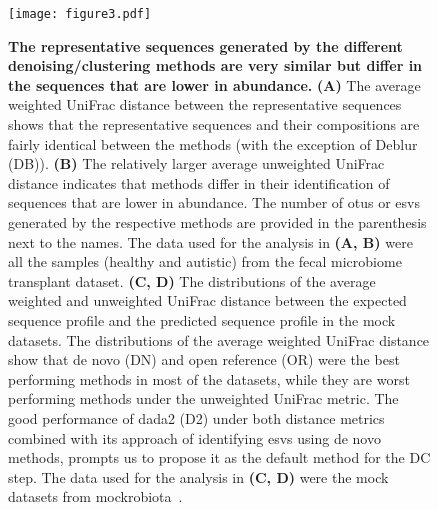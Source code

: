   \begin{figure}[H]
    \centering
    \texttt{[image: figure3.pdf]}
  \end{figure}
  \begin{figure}[H]
    \centering
    \caption{
      \textbf{The representative sequences generated by the different denoising/clustering methods are very similar but differ in the sequences that are lower in abundance.}
      \textbf{(A)} The average weighted UniFrac distance between the representative sequences shows that the representative sequences and their compositions are fairly identical between the methods (with the exception of Deblur (DB)).
      \textbf{(B)} The relatively larger average unweighted UniFrac distance indicates that methods differ in their identification of sequences that are lower in abundance.
      The number of \ac{otu}s or \ac{esv}s generated by the respective methods are provided in the parenthesis next to the names.
      The data used for the analysis in \textbf{(A, B)} were all the samples (healthy and autistic) from the fecal microbiome transplant dataset.
      \textbf{(C, D)} The distributions of the average weighted and unweighted UniFrac distance between the expected sequence profile and the predicted sequence profile in the mock datasets.
      The distributions of the average weighted UniFrac distance show that de novo (DN) and open reference (OR) were the best performing methods in most of the datasets, while they are worst performing methods under the unweighted UniFrac metric.
      The good performance of dada2 (D2) under both distance metrics combined with its approach of identifying \ac{esv}s using de novo methods, prompts us to propose it as the default method for the DC step.
      The data used for the analysis in \textbf{(C, D)} were the mock datasets from mockrobiota~\cite{Bokulich2016}.
    }
    \label{fig:figure3}
  \end{figure}
  \FloatBarrier
  \newpage

